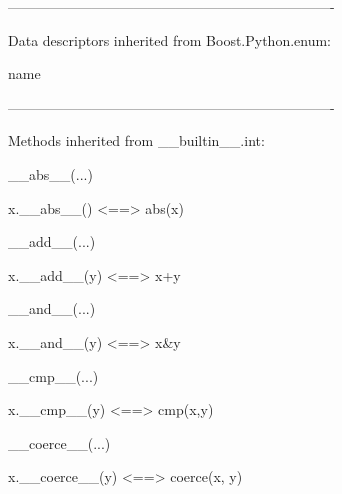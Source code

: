 \documentclass[letterpaper,10pt,english]{sphinxmanual}
\begin{document}
\begin{description}
\begin{description}
\begin{DUlineblock}{0em}
\begin{DUlineblock}{\DUlineblockindent}
\end{DUlineblock}
\item[] ----------------------------------------------------------------------
\item[] Data descriptors inherited from Boost.Python.enum:
\item[] 
\item[] name
\item[] 
\item[] ----------------------------------------------------------------------
\item[] Methods inherited from \_\_builtin\_\_.int:
\item[] 
\item[] \_\_abs\_\_(...)
\item[]
\begin{DUlineblock}{\DUlineblockindent}
\item[] x.\_\_abs\_\_() \textless{}==\textgreater{} abs(x)
\item[] 
\end{DUlineblock}
\item[] \_\_add\_\_(...)
\item[]
\begin{DUlineblock}{\DUlineblockindent}
\item[] x.\_\_add\_\_(y) \textless{}==\textgreater{} x+y
\item[] 
\end{DUlineblock}
\item[] \_\_and\_\_(...)
\item[]
\begin{DUlineblock}{\DUlineblockindent}
\item[] x.\_\_and\_\_(y) \textless{}==\textgreater{} x\&y
\item[] 
\end{DUlineblock}
\item[] \_\_cmp\_\_(...)
\item[]
\begin{DUlineblock}{\DUlineblockindent}
\item[] x.\_\_cmp\_\_(y) \textless{}==\textgreater{} cmp(x,y)
\item[] 
\end{DUlineblock}
\item[] \_\_coerce\_\_(...)
\item[]
\begin{DUlineblock}{\DUlineblockindent}
\item[] x.\_\_coerce\_\_(y) \textless{}==\textgreater{} coerce(x, y)
\item[] 

\end{DUlineblock}
\end{DUlineblock}
\end{description}
\end{description}
\end{document}
